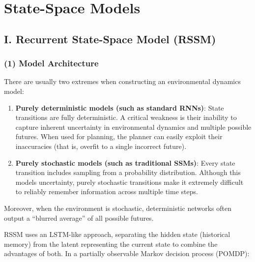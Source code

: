 \setcounter{section}{2}

\hypertarget{state-space-models}{%
\section{State-Space Models}\label{state-space-models}}

\hypertarget{i.-recurrent-state-space-model-rssm}{%
\subsection{I. Recurrent State-Space Model (RSSM)}\label{i.-recurrent-state-space-model-rssm}}

\hypertarget{model-architecture}{%
\subsubsection{(1) Model Architecture}\label{model-architecture}}

There are usually two extremes when constructing an environmental dynamics model:

\begin{enumerate}
\def\labelenumi{\arabic{enumi}.}
\item
  \textbf{Purely deterministic models (such as standard RNNs)}: State transitions are fully deterministic. A critical weakness is their inability to capture inherent uncertainty in environmental dynamics and multiple possible futures. When used for planning, the planner can easily exploit their inaccuracies (that is, overfit to a single incorrect future).
\item
  \textbf{Purely stochastic models (such as traditional SSMs)}: Every state transition includes sampling from a probability distribution. Although this models uncertainty, purely stochastic transitions make it extremely difficult to reliably remember information across multiple time steps.
\end{enumerate}

Moreover, when the environment is stochastic, deterministic networks often output a ``blurred average'' of all possible futures.

RSSM uses an LSTM-like approach, separating the hidden state (historical memory) from the latent representing the current state to combine the advantages of both. In a partially observable Markov decision process (POMDP):

